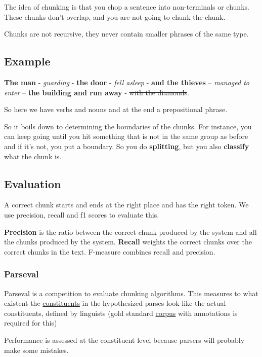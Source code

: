 \documentclass[
  11pt,
  british,
]{article}
\begin{document}
The idea of chunking is that you chop a sentence into non-terminals or
chunks. These chunks don't overlap, and you are not going to chunk the
chunk.

Chunks are not recursive, they never contain smaller phrases of the same
type.

\hypertarget{example-10}{%
\subsection{Example}\label{example-10}}

\textbf{The man} - \emph{guarding} - \textbf{the door} - \emph{fell
asleep} - \textbf{and the thieves} -- \emph{managed to enter} --
\textbf{the building and run away} - \sout{with the diamonds}.

So here we have verbs and nouns and at the end a prepositional phrase.

So it boils down to determining the boundaries of the chunks. For
instance, you can keep going until you hit something that is not in the
same group as before and if it's not, you put a boundary. So you do
\textbf{splitting}, but you also \textbf{classify} what the chunk is.

\hypertarget{evaluation-3}{%
\subsection{Evaluation}\label{evaluation-3}}

A correct chunk starts and ends at the right place and has the right
token. We use precision, recall and f1 scores to evaluate this.

\textbf{Precision} is the ratio between the correct chunk produced by
the system and all the chunks produced by the system. \textbf{Recall}
weights the correct chunks over the correct chunks in the text.
F-measure combines recall and precision.

\hypertarget{parseval}{%
\subsubsection{Parseval}\label{parseval}}

Parseval is a competition to evaluate chunking algorithms. This measures
to what existent the \href{Constituency.md}{constituents} in the
hypothesized parses look like the actual constituents, defined by
linguists (gold standard \href{../Data/Corpus.md}{corpus} with
annotations is required for this)

Performance is assessed at the constituent level because parsers will
probably make some mistakes.
\end{document}
